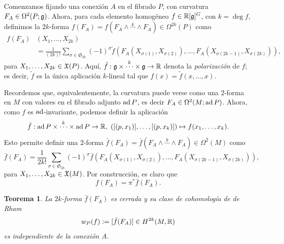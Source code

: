 \documentclass[11pt,a4paper]{amsbook}
\newtheorem{thm}[subsection]{Teorema}
\theoremstyle{remark} \newtheorem{rmk}[subsection]{Observación}
\theoremstyle{definition} \newtheorem{defn}[subsection]{Definición}
\theoremstyle{definition} \newtheorem{ex}[subsection]{Ejemplo}
\theoremstyle{definition} \newtheorem{ej}[subsection]{Ejercicio}
\begin{document}
Comenzamos fijando una conexión $A$ en el fibrado $P$, con curvatura $F_A\in \Omega^2(P;\mathfrak{g})$. Ahora, para cada elemento homogéneo $f\in \mathbb R[\mathfrak{g}]^G$, con $k=\deg f$, definimos la $2k$-forma $f(F_A)=f(F_A\wedge \overset{k}{\cdots} \wedge F_A)\in \Omega^{2k}(P)$ como
\begin{align*}
f(F_A)&(X_1,\dots,X_{2k}) \\
  &= \frac{1}{(2k)!} \sum_{\sigma \in \mathfrak{S}_{2k}} (-1)^\sigma \tilde{f}(F_A(X_{\sigma(1)},X_{\sigma(2)}),\dots,F_A(X_{\sigma(2k-1)},X_{\sigma(2k)})),
\end{align*}
para $X_1,\dots,X_{2k} \in \mathfrak X(P)$. Aquí, $\tilde{f}:\mathfrak{g} \times \overset{k}{\cdots} \times \mathfrak{g} \rightarrow \mathbb R$ denota la \emph{polarización} de $f$; es decir, $\tilde{f}$ es la única aplicación $k$-lineal tal que $f(x)=\tilde{f}(x,\dots,x)$.

Recordemos que, equivalentemente, la curvatura puede verse como una $2$-forma en $M$ con valores en el fibrado adjunto $\operatorname{ad} P$, es decir $F_A \in \Omega^2(M;\operatorname{ad} P)$. Ahora, como $f$ es $\operatorname{ad}$-invariante, podemos definir la aplicación
\begin{equation*}
\bar{f}: \ad P \times \overset{k}{\cdots} \times \ad P \rightarrow \RR,\ ([(p,x_1)],\dots,[(p,x_k)]) \mapsto f(x_1,\dots,x_k).
\end{equation*}
Esto permite definir una $2$-forma $\bar{f}(F_A)=\bar{f}(F_A \wedge \overset{k}{\cdots} \wedge F_A)\in \Omega^2(M)$ como
\begin{equation*}
\bar{f}(F_A) = \frac{1}{2k!} \sum_{\sigma \in \mathfrak{S}_{2k}} (-1)^\sigma \bar{f}(F_A(X_{\sigma(1)},X_{\sigma(2)}),\dots,F_A(X_{\sigma(2k-1)},X_{\sigma(2k)})),
\end{equation*}
para $X_1,\dots,X_{2k} \in \mathfrak X(M)$. Por construcción, es claro que
\begin{equation*}
f(F_A) = \pi^* \bar{f}(F_A).
\end{equation*}

\begin{thm} La $2k$-forma $\bar{f}(F_A)$ es cerrada y su clase de cohomología de de Rham
        \begin{equation*}
w_P(f) := [\bar{f}(F_A)] \in H^{2k}(M,\mathbb R)
        \end{equation*}
        es independiente de la conexión $A$.
\end{thm}
\end{document}
